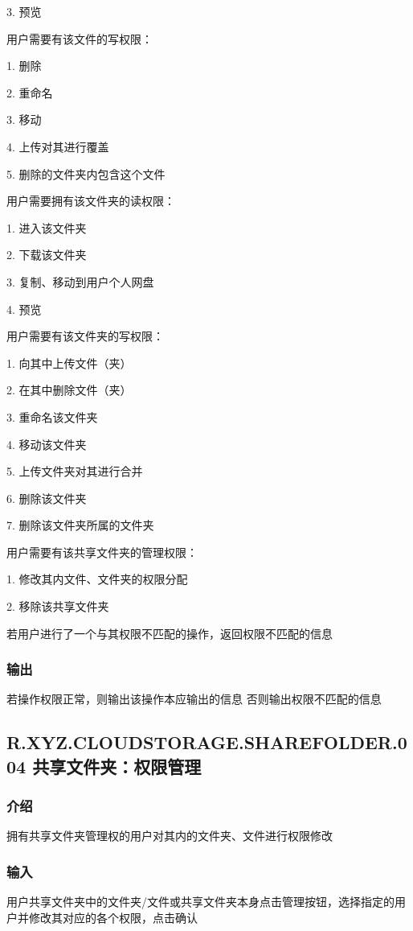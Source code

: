 3. 预览

用户需要有该文件的写权限：

1. 删除

2. 重命名

3. 移动

4. 上传对其进行覆盖

5. 删除的文件夹内包含这个文件

用户需要拥有该文件夹的读权限：

1. 进入该文件夹

2. 下载该文件夹

3. 复制、移动到用户个人网盘

4. 预览

用户需要有该文件夹的写权限：

1. 向其中上传文件（夹）

2. 在其中删除文件（夹）

3. 重命名该文件夹

4. 移动该文件夹

5. 上传文件夹对其进行合并

6. 删除该文件夹

7. 删除该文件夹所属的文件夹

用户需要有该共享文件夹的管理权限：

1. 修改其内文件、文件夹的权限分配

2. 移除该共享文件夹

若用户进行了一个与其权限不匹配的操作，返回权限不匹配的信息

\subsubsection{输出} 
若操作权限正常，则输出该操作本应输出的信息
否则输出权限不匹配的信息


\subsection{R.XYZ.CLOUDSTORAGE.SHAREFOLDER.004 共享文件夹：权限管理}

\subsubsection{介绍}
拥有共享文件夹管理权的用户对其内的文件夹、文件进行权限修改

\subsubsection{输入} 
用户共享文件夹中的文件夹/文件或共享文件夹本身点击管理按钮，选择指定的用户并修改其对应的各个权限，点击确认

